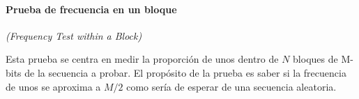 


\paragraph{Prueba de frecuencia en un bloque} %
\textit{(Frequency Test within a Block)}

Esta prueba se centra en medir la proporción de unos dentro de $N$ bloques de
M-bits de la secuencia a probar. El propósito de la prueba es saber si la
frecuencia de unos se aproxima a $M/2$ como sería de esperar de una secuencia
aleatoria.


